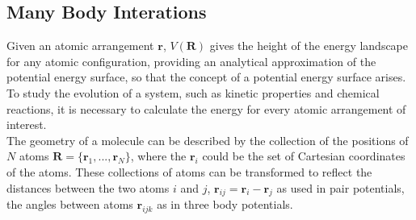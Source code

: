 \subsection{Many Body Interations}
Given an atomic arrangement $\bm{r}$, $V(\bm{R})$ gives the height of the energy landscape for any atomic configuration, providing an analytical approximation of the potential energy surface, so that the concept of a potential energy surface arises.
To study the evolution of a system, such as kinetic properties and chemical reactions, it is necessary to calculate the energy for every atomic arrangement of interest.
\\
The geometry of a molecule can be described by the collection of the positions of $N$ atoms
	$\bm{R} = \{\bm{r}_1,...,\bm{r}_N\}$,
	where the $\bm{r}_i$ could be the set of Cartesian coordinates of the atoms.
These collections of atoms can be transformed to reflect the distances between the two atoms $i$ and $j$,
	$\bm{r}_{ij}=\bm{r}_i - \bm{r}_j$
	as used in pair potentials, the angles between atoms $\bm{r}_{ijk}$ as in three body potentials.
